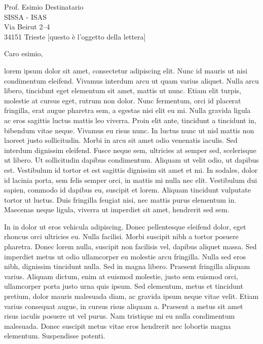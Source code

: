 \documentclass[10pt,italian,a4paper]{letteracdp}
\date{5 dicembre 2009} %
\begin{document}
\begin{foldedletter}{
    Prof. Esimio Destinatario\\
    SISSA - ISAS\\
    Via Beirut 2--4\\
    34151 Trieste
  }
  [questo è l'oggetto della lettera]


  \opening[Trieste,]{Caro esimio,}

lorem ipsum dolor sit amet, consectetur adipiscing elit. Nunc id mauris ut nisi condimentum eleifend. Vivamus interdum arcu ut quam varius aliquet. Nulla arcu libero, tincidunt eget elementum sit amet, mattis ut nunc. Etiam elit turpis, molestie at cursus eget, rutrum non dolor. Nunc fermentum, orci id placerat fringilla, erat augue pharetra sem, a egestas nisi elit eu mi. Nulla gravida ligula ac eros sagittis luctus mattis leo viverra. Proin elit ante, tincidunt a tincidunt in, bibendum vitae neque. Vivamus eu risus nunc. In luctus nunc ut nisl mattis non laoreet justo sollicitudin. Morbi in arcu sit amet odio venenatis iaculis. Sed interdum dignissim eleifend. Fusce neque sem, ultricies at semper sed, scelerisque ut libero. Ut sollicitudin dapibus condimentum. Aliquam ut velit odio, ut dapibus est. Vestibulum id tortor et est sagittis dignissim sit amet et mi. In sodales, dolor id lacinia porta, sem felis semper orci, in mattis mi nulla nec elit. Vestibulum dui sapien, commodo id dapibus eu, suscipit et lorem. Aliquam tincidunt vulputate tortor ut luctus. Duis fringilla feugiat nisi, nec mattis purus elementum in. Maecenas neque ligula, viverra ut imperdiet sit amet, hendrerit sed sem.

In in dolor ut eros vehicula adipiscing. Donec pellentesque eleifend dolor, eget rhoncus orci ultricies eu. Nulla facilisi. Morbi suscipit nibh a tortor posuere pharetra. Donec lorem nulla, suscipit non facilisis vel, dapibus aliquet massa. Sed imperdiet metus ut odio ullamcorper eu molestie arcu fringilla. Nulla sed eros nibh, dignissim tincidunt nulla. Sed in magna libero. Praesent fringilla aliquam varius. Aliquam dictum, enim at euismod molestie, justo sem euismod orci, ullamcorper porta justo urna quis ipsum. Sed elementum, metus et tincidunt pretium, dolor mauris malesuada diam, ac gravida ipsum neque vitae velit. Etiam varius consequat augue, in cursus risus aliquam a. Praesent a metus sit amet risus iaculis posuere ut vel purus. Nam tristique mi eu nulla condimentum malesuada. Donec suscipit metus vitae eros hendrerit nec lobortis magna elementum. Suspendisse potenti.


\end{foldedletter}
\end{document}
